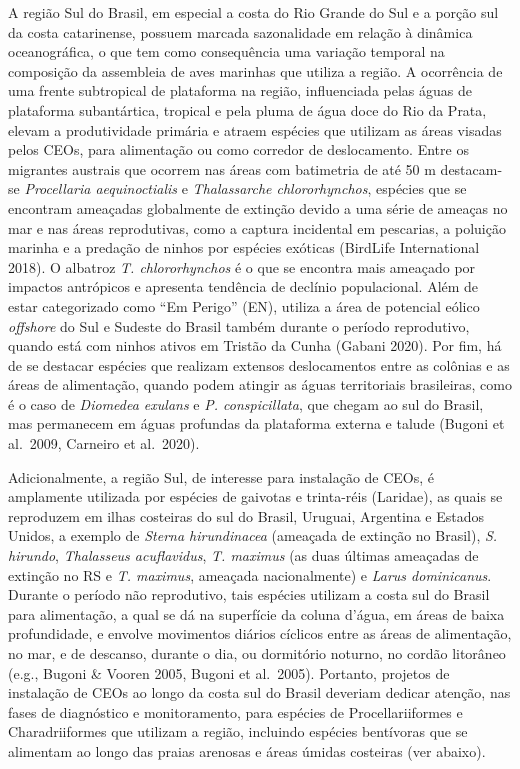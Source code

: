\documentclass[
  oneside]{scrbook}
\begin{document}
A região Sul do Brasil, em especial a costa do Rio Grande do Sul e a porção sul da costa catarinense, possuem marcada sazonalidade em relação à dinâmica oceanográfica, o que tem como consequência uma variação temporal na composição da assembleia de aves marinhas que utiliza a região. A ocorrência de uma frente subtropical de plataforma na região, influenciada pelas águas de plataforma subantártica, tropical e pela pluma de água doce do Rio da Prata, elevam a produtividade primária e atraem espécies que utilizam as áreas visadas pelos CEOs, para alimentação ou como corredor de deslocamento. Entre os migrantes austrais que ocorrem nas áreas com batimetria de até 50 m destacam-se \emph{Procellaria aequinoctialis} e \emph{Thalassarche chlororhynchos}, espécies que se encontram ameaçadas globalmente de extinção devido a uma série de ameaças no mar e nas áreas reprodutivas, como a captura incidental em pescarias, a poluição marinha e a predação de ninhos por espécies exóticas (BirdLife International 2018). O albatroz \emph{T. chlororhynchos} é o que se encontra mais ameaçado por impactos antrópicos e apresenta tendência de declínio populacional. Além de estar categorizado como ``Em Perigo'' (EN), utiliza a área de potencial eólico \emph{offshore} do Sul e Sudeste do Brasil também durante o período reprodutivo, quando está com ninhos ativos em Tristão da Cunha (Gabani 2020). Por fim, há de se destacar espécies que realizam extensos deslocamentos entre as colônias e as áreas de alimentação, quando podem atingir as águas territoriais brasileiras, como é o caso de \emph{Diomedea exulans} e \emph{P. conspicillata}, que chegam ao sul do Brasil, mas permanecem em águas profundas da plataforma externa e talude (Bugoni et al.~2009, Carneiro et al.~2020).

Adicionalmente, a região Sul, de interesse para instalação de CEOs, é amplamente utilizada por espécies de gaivotas e trinta-réis (Laridae), as quais se reproduzem em ilhas costeiras do sul do Brasil, Uruguai, Argentina e Estados Unidos, a exemplo de \emph{Sterna hirundinacea} (ameaçada de extinção no Brasil), \emph{S. hirundo}, \emph{Thalasseus acuflavidus}, \emph{T. maximus} (as duas últimas ameaçadas de extinção no RS e \emph{T. maximus}, ameaçada nacionalmente) e \emph{Larus dominicanus}. Durante o período não reprodutivo, tais espécies utilizam a costa sul do Brasil para alimentação, a qual se dá na superfície da coluna d'água, em áreas de baixa profundidade, e envolve movimentos diários cíclicos entre as áreas de alimentação, no mar, e de descanso, durante o dia, ou dormitório noturno, no cordão litorâneo (e.g., Bugoni \& Vooren 2005, Bugoni et al.~2005). Portanto, projetos de instalação de CEOs ao longo da costa sul do Brasil deveriam dedicar atenção, nas fases de diagnóstico e monitoramento, para espécies de Procellariiformes e Charadriiformes que utilizam a região, incluindo espécies bentívoras que se alimentam ao longo das praias arenosas e áreas úmidas costeiras (ver abaixo).
\end{document}
